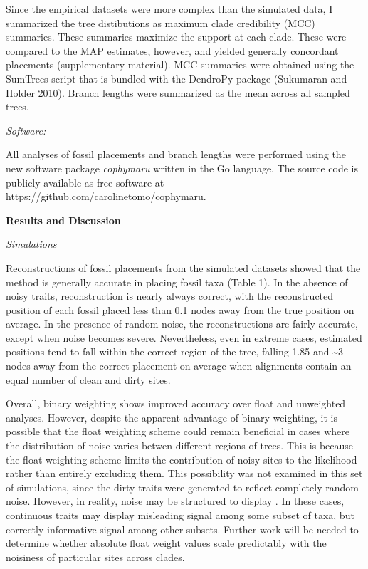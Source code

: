 \documentclass[12pt]{article}
\begin{document}
Since the empirical datasets were more complex than the simulated data,
I summarized the tree distibutions as maximum clade credibility (MCC)
summaries. These summaries maximize the support at each clade. These
were compared to the MAP estimates, however, and yielded generally
concordant placements (supplementary material). MCC summaries were
obtained using the SumTrees script that is bundled with the DendroPy
package (Sukumaran and Holder 2010). Branch lengths were summarized as
the mean across all sampled trees.

\emph{Software:}

All analyses of fossil placements and branch lengths were performed
using the new software package \emph{cophymaru} written in the Go
language. The source code is publicly available as free software at
https://github.com/carolinetomo/cophymaru.

\textbf{Results and Discussion}

\emph{Simulations}

Reconstructions of fossil placements from the simulated datasets showed
that the method is generally accurate in placing fossil taxa (Table 1).
In the absence of noisy traits, reconstruction is nearly always correct,
with the reconstructed position of each fossil placed less than 0.1
nodes away from the true position on average. In the presence of random
noise, the reconstructions are fairly accurate, except when noise
becomes severe. Nevertheless, even in extreme cases, estimated positions
tend to fall within the correct region of the tree, falling 1.85 and
\textasciitilde{}3 nodes away from the correct placement on average when
alignments contain an equal number of clean and dirty sites.

Overall, binary weighting shows improved accuracy over float and
unweighted analyses. However, despite the apparent advantage of binary
weighting, it is possible that the float weighting scheme could remain
beneficial in cases where the distribution of noise varies betwen
different regions of trees. This is because the float weighting scheme
limits the contribution of noisy sites to the likelihood rather than
entirely excluding them. This possibility was not examined in this set
of simulations, since the dirty traits were generated to reflect
completely random noise. However, in reality, noise may be structured to
display . In these cases, continuous traits may display misleading
signal among some subset of taxa, but correctly informative signal among
other subsets. Further work will be needed to determine whether absolute
float weight values scale predictably with the noisiness of particular
sites across clades.
\end{document}
